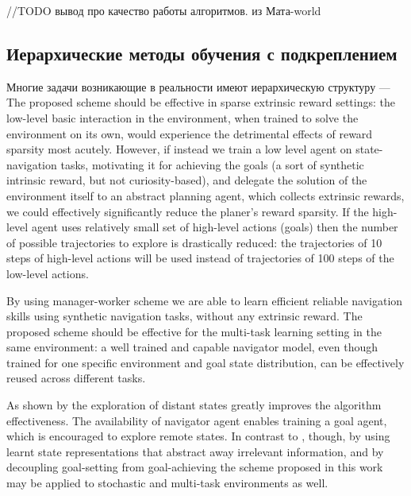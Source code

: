 //TODO вывод про качество работы алгоритмов. из Мата-world

\subsection{Иерархические методы обучения с подкреплением}

Многие задачи возникающие в реальности имеют иерархическую структуру --- 
The proposed scheme should be effective in sparse extrinsic reward settings: the low-level basic interaction in the environment, when trained to solve the environment on its own, would experience the detrimental effects of reward sparsity most acutely. However, if instead we train a low level agent on state-navigation tasks, motivating it for achieving the goals (a sort of synthetic intrinsic reward, but not curiosity-based), and delegate the solution of the environment itself to an abstract planning agent, which collects extrinsic rewards, we could effectively significantly reduce the planer's reward sparsity. If the high-level agent uses relatively small set of high-level actions (goals) then the number of possible trajectories to explore is drastically reduced: the trajectories of 10 steps of high-level actions will be used instead of trajectories of 100 steps of the low-level actions.

By using manager-worker scheme we are able to learn efficient reliable navigation skills using synthetic navigation tasks, 
without any extrinsic reward.
%
The proposed scheme should be effective for the multi-task learning setting in the same environment: a well trained and capable navigator model, even though trained for one specific environment and goal state distribution, can be effectively reused across different tasks.

As shown by \citet{ecoffet_first_2021} the exploration of distant states greatly improves the algorithm effectiveness. The availability of navigator agent enables training a goal agent, which is encouraged to explore remote states.
%
In contrast to \citep{ecoffet_first_2021}, though, by using learnt state representations that abstract away irrelevant information, and by decoupling goal-setting from goal-achieving the scheme proposed in this work may be applied to stochastic and multi-task environments as well.

